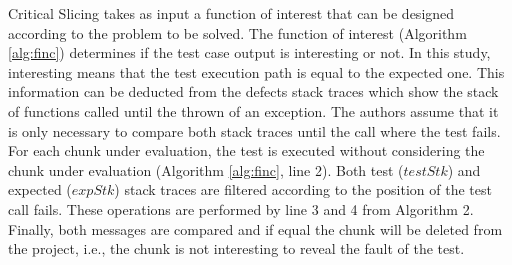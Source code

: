 \documentclass{article}
\begin{document}
%
%
%
%
%

 Critical Slicing takes as input a function of interest that can be designed according to the problem to be solved. The function of interest (Algorithm \ref{alg:finc}) determines if the test case output is interesting or not. In this study, interesting means that the test execution path is equal to the expected one. This information can be deducted from the defects stack traces which show the stack of functions called until the thrown of an exception. The authors assume that it is only necessary to compare both stack traces until the call where the test fails. For each chunk under evaluation, the test is executed without considering the chunk under evaluation (Algorithm \ref{alg:finc}, line 2). Both test ($testStk$) and expected ($expStk$) stack traces are filtered according to the position of the test call fails. These operations are performed by line 3 and 4 from Algorithm 2. Finally, both messages are compared and if equal the chunk will be deleted from the project, i.e., the chunk is not interesting to reveal the fault of the test.
\end{document}

